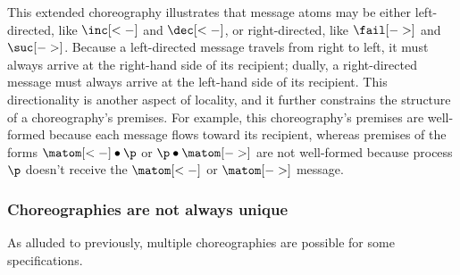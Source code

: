 \documentclass[
  class=../hdeyoung-proposal,
  crop=false
]{standalone}
\begin{document}
This extended choreography illustrates that message atoms may be either left-directed, like $\inc[<-]$ and $\dec[<-]$, or right-directed, like $\fail[->]$ and $\suc[->]$.
% 
Because a left-directed message travels from right to left, it must always arrive at the right-hand side of its recipient; dually, a right-directed message must always arrive at the left-hand side of its recipient.
This directionality is another aspect of locality, and it further constrains the structure of a choreography's premises.
For example, this choreography's premises are well-formed because each message flows toward its recipient, whereas premises of the forms $\matom[<-] \fuse \p$ or $\p \fuse \matom[->]$ are not well-formed because process $\p$ doesn't receive the $\matom[<-]$ or $\matom[->]$ message.



\subsubsection{Choreographies are not always unique}\label{sec:mult-chor-are}

As alluded to previously, multiple choreographies are possible for some specifications.
\end{document}
